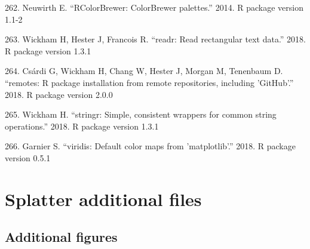 \documentclass[11pt,a4paper,titlepage,twoside,openright]{style/unimelbthesis}
\theoremstyle{definition}
\theoremstyle{definition}
\theoremstyle{definition}
\theoremstyle{remark}
\begin{document}
\begin{mainmatter}
\leavevmode\hypertarget{ref-R-RColorBrewer}{}%
262. Neuwirth E. ``RColorBrewer: ColorBrewer palettes.'' 2014. R package version 1.1-2

\leavevmode\hypertarget{ref-R-readr}{}%
263. Wickham H, Hester J, Francois R. ``readr: Read rectangular text data.'' 2018. R package version 1.3.1

\leavevmode\hypertarget{ref-R-remotes}{}%
264. Csárdi G, Wickham H, Chang W, Hester J, Morgan M, Tenenbaum D. ``remotes: R package installation from remote repositories, including 'GitHub'.'' 2018. R package version 2.0.0

\leavevmode\hypertarget{ref-R-stringr}{}%
265. Wickham H. ``stringr: Simple, consistent wrappers for common string operations.'' 2018. R package version 1.3.1

\leavevmode\hypertarget{ref-R-viridis}{}%
266. Garnier S. ``viridis: Default color maps from 'matplotlib'.'' 2018. R package version 0.5.1

\appendix

\hypertarget{splatter-additional}{%
\chapter{Splatter additional files}\label{splatter-additional}}

\hypertarget{additional-figures}{%
\section{Additional figures}\label{additional-figures}}

\clearpage
{}\clearpage
{}\clearpage
{}\clearpage
{}\clearpage
{}\clearpage
{}\clearpage
{}\clearpage
{}\clearpage
{}\clearpage
{}\clearpage
{}\clearpage
{}\clearpage
{}\clearpage
{}\clearpage
{}\clearpage
{}\clearpage


\end{mainmatter}
\end{document}
